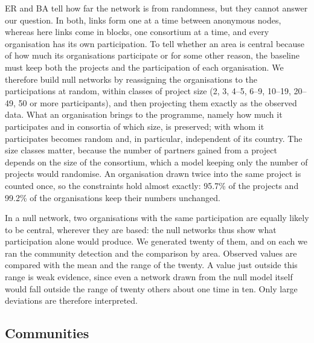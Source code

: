 \documentclass[sigchi]{acmart}
\begin{document}
ER and BA tell how far the network is from randomness, but they cannot answer our question. In both, links form one at a time between anonymous nodes, whereas here links come in blocks, one consortium at a time, and every organisation has its own participation. To tell whether an area is central because of how much its organisations participate or for some other reason, the baseline must keep both the projects and the participation of each organisation. We therefore build null networks by reassigning the organisations to the participations at random, within classes of project size (2, 3, 4--5, 6--9, 10--19, 20--49, 50 or more participants), and then projecting them exactly as the observed data. What an organisation brings to the programme, namely how much it participates and in consortia of which size, is preserved; with whom it participates becomes random and, in particular, independent of its country. The size classes matter, because the number of partners gained from a project depends on the size of the consortium, which a model keeping only the number of projects would randomise. An organisation drawn twice into the same project is counted once, so the constraints hold almost exactly: 95.7\% of the projects and 99.2\% of the organisations keep their numbers unchanged.

In a null network, two organisations with the same participation are equally likely to be central, wherever they are based: the null networks thus show what participation alone would produce. We generated twenty of them, and on each we ran the community detection and the comparison by area. Observed values are compared with the mean and the range of the twenty. A value just outside this range is weak evidence, since even a network drawn from the null model itself would fall outside the range of twenty others about one time in ten. Only large deviations are therefore interpreted.

\subsection{Communities}
\end{document}
